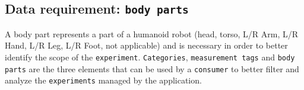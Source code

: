 \documentclass[12pt,a4paper,twoside]{article}
\begin{document}
\subsection{Data requirement: \texttt{body parts}}
A body part represents a part of a humanoid robot (head, torso, L/R Arm, L/R Hand, L/R Leg, L/R Foot, not applicable) and is necessary in order to better identify the scope of the \texttt{experiment}. \texttt{Categories}, \texttt{measurement tags} and \texttt{body parts} are the three elements that can be used by a \texttt{consumer} to better filter and analyze the \texttt{experiments} managed by the application.



\end{document}
